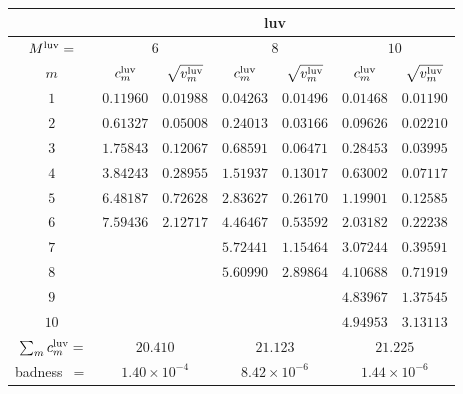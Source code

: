 \begin{tabular}{c|cc|cc|cc|}
&
\multicolumn{6}{|c|}{luv} \\
\hline
$M^{\mathrm{luv}}=$ &
 \multicolumn{2}{|c|}{$6$} &
 \multicolumn{2}{|c|}{$8$} &
 \multicolumn{2}{|c|}{$10$} \\
$m$ &
 $c^{\mathrm{luv}}_m$ & $\sqrt{v^{\mathrm{luv}}_m}$ &
 $c^{\mathrm{luv}}_m$ & $\sqrt{v^{\mathrm{luv}}_m}$ &
 $c^{\mathrm{luv}}_m$ & $\sqrt{v^{\mathrm{luv}}_m}$ \\
$1$ &
 $0.11960$ & $0.01988$ &
 $0.04263$ & $0.01496$ &
 $0.01468$ & $0.01190$ \\
$2$ &
 $0.61327$ & $0.05008$ &
 $0.24013$ & $0.03166$ &
 $0.09626$ & $0.02210$ \\
$3$ &
 $1.75843$ & $0.12067$ &
 $0.68591$ & $0.06471$ &
 $0.28453$ & $0.03995$ \\
$4$ &
 $3.84243$ & $0.28955$ &
 $1.51937$ & $0.13017$ &
 $0.63002$ & $0.07117$ \\
$5$ &
 $6.48187$ & $0.72628$ &
 $2.83627$ & $0.26170$ &
 $1.19901$ & $0.12585$ \\
$6$ &
 $7.59436$ & $2.12717$ &
 $4.46467$ & $0.53592$ &
 $2.03182$ & $0.22238$ \\
$7$ &
 $~$ & $~$ &
 $5.72441$ & $1.15464$ &
 $3.07244$ & $0.39591$ \\
$8$ &
 $~$ & $~$ &
 $5.60990$ & $2.89864$ &
 $4.10688$ & $0.71919$ \\
$9$ &
 $~$ & $~$ &
 $~$ & $~$ &
 $4.83967$ & $1.37545$ \\
$10$ &
 $~$ & $~$ &
 $~$ & $~$ &
 $4.94953$ & $3.13113$ \\
\hline
$\sum_m c^{\mathrm{luv}}_m=$ &
 \multicolumn{2}{|c|}{$20.410$} &
 \multicolumn{2}{|c|}{$21.123$} &
 \multicolumn{2}{|c|}{$21.225$} \\
badness~$=$ &
 \multicolumn{2}{|c|}{$1.40\times 10^{-4}$} &
 \multicolumn{2}{|c|}{$8.42\times 10^{-6}$} &
 \multicolumn{2}{|c|}{$1.44\times 10^{-6}$} \\
\end{tabular}
